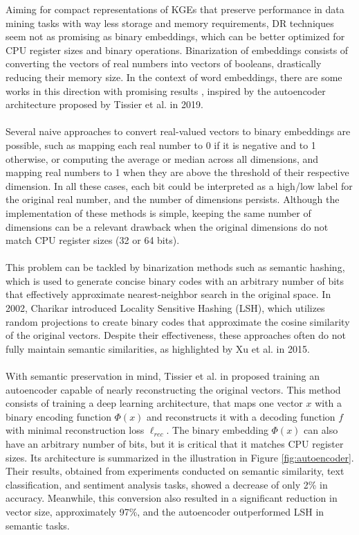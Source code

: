 \documentclass[11pt,titlepage,oneside,openany]{book}
\begin{document}
Aiming for compact representations of KGEs that preserve performance in data mining tasks with way less storage and memory requirements, DR techniques seem not as promising as binary embeddings, which can be better optimized for CPU register sizes and binary operations. Binarization of embeddings consists of converting the vectors of real numbers into vectors of booleans, drastically reducing their memory size. In the context of word embeddings, there are some works in this direction with promising results \cite{navali_word_2020, pan_relation_2021}, inspired by the autoencoder architecture proposed by Tissier et al. \cite{tissier_near-lossless_2019} in 2019.\\
\\
Several naive approaches to convert real-valued vectors to binary embeddings are possible, such as mapping each real number to 0 if it is negative and to 1 otherwise, or computing the average or median across all dimensions, and mapping real numbers to 1 when they are above the threshold of their respective dimension. In all these cases, each bit could be interpreted as a high/low label for the original real number, and the number of dimensions persists. Although the implementation of these methods is simple, keeping the same number of dimensions can be a relevant drawback when the original dimensions do not match CPU register sizes (32 or 64 bits).\\
\\
This problem can be tackled by binarization methods such as semantic hashing, which is used to generate concise binary codes with an arbitrary number of bits that effectively approximate nearest-neighbor search in the original space. In 2002, Charikar \cite{charikar_similarity_2002} introduced Locality Sensitive Hashing (LSH), which utilizes random projections to create binary codes that approximate the cosine similarity of the original vectors. Despite their effectiveness, these approaches often do not fully maintain semantic similarities, as highlighted by Xu et al. \cite{xu_convolutional_2015} in 2015.\\
\\
With semantic preservation in mind, Tissier et al. in \cite{tissier_near-lossless_2019} proposed training an autoencoder capable of nearly reconstructing the original vectors. This method consists of training a deep learning architecture, that maps one vector $x$ with a binary encoding function $\Phi(x)$ and reconstructs it with a decoding function $f$ with minimal reconstruction loss $\ell_{rec}$. The binary embedding $\Phi(x)$ can also have an arbitrary number of bits, but it is critical that it matches CPU register sizes. Its architecture is summarized in the illustration in Figure \ref{fig:autoencoder}. Their results, obtained from experiments conducted on semantic similarity, text classification, and sentiment analysis tasks, showed a decrease of only 2\% in accuracy. Meanwhile, this conversion also resulted in a significant reduction in vector size, approximately 97\%, and the autoencoder outperformed LSH in semantic tasks.\\
\end{document}
